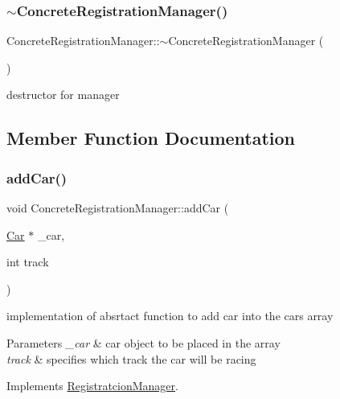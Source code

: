 \subsubsection{\texorpdfstring{$\sim$\+Concrete\+Registration\+Manager()}{~ConcreteRegistrationManager()}}
{\footnotesize\ttfamily Concrete\+Registration\+Manager\+::$\sim$\+Concrete\+Registration\+Manager (\begin{DoxyParamCaption}{ }\end{DoxyParamCaption})}

destructor for manager 

\subsection{Member Function Documentation}
\mbox{\label{class_concrete_registration_manager_a852824cb63b25c30dd4f626d5097c748}} 
\subsubsection{\texorpdfstring{add\+Car()}{addCar()}}
{\footnotesize\ttfamily void Concrete\+Registration\+Manager\+::add\+Car (\begin{DoxyParamCaption}\item[{\mbox{\hyperlink{class_car}{Car}} $\ast$}]{\+\_\+car,  }\item[{int}]{track }\end{DoxyParamCaption})\hspace{0.3cm}{\ttfamily [virtual]}}

implementation of absrtact function to add car into the cars array 
\begin{DoxyParams}{Parameters}
{\em \+\_\+car} & car object to be placed in the array \\
\hline
{\em track} & specifies which track the car will be racing \\
\hline
\end{DoxyParams}


Implements \mbox{\hyperlink{class_registratcion_manager_aec32edc5e4e17c3816889202f17ca3a5}{Registratcion\+Manager}}.

\mbox{\label{class_concrete_registration_manager_ab7b6cd458f9ff3c5ff7b9413dff48e6a}} 
